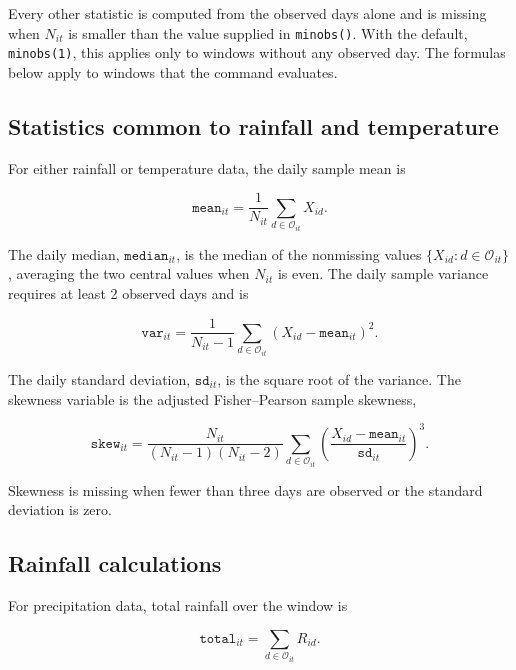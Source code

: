 \noindent Every other statistic is computed from the observed days alone and is missing when $N_{it}$ is smaller than the value supplied in \texttt{minobs()}. With the default, \texttt{minobs(1)}, this applies only to windows without any observed day. The formulas below apply to windows that the command evaluates.

\subsection{Statistics common to rainfall and temperature}

For either rainfall or temperature data, the daily sample mean is

\begin{equation}
	\texttt{mean}_{it} = \frac{1}{N_{it}} \sum_{d \in \mathcal{O}_{it}} X_{id} .
\end{equation}

\noindent The daily median, $\texttt{median}_{it}$, is the median of the nonmissing values $\{X_{id} : d \in \mathcal{O}_{it}\}$, averaging the two central values when $N_{it}$ is even. The daily sample variance requires at least 2 observed days and is

\begin{equation}
	\texttt{var}_{it} = \frac{1}{N_{it} - 1} \sum_{d \in \mathcal{O}_{it}} \left(X_{id} - \texttt{mean}_{it}\right)^2 .
\end{equation}

The daily standard deviation, $\texttt{sd}_{it}$, is the square root of the variance. The skewness variable is the adjusted Fisher--Pearson sample skewness,

\begin{equation}
	\texttt{skew}_{it} = \frac{N_{it}}{(N_{it} - 1) (N_{it} - 2)} \sum_{d \in \mathcal{O}_{it}} \left(\frac{X_{id} - \texttt{mean}_{it}}{\texttt{sd}_{it}}\right)^3 .
\end{equation}

\noindent Skewness is missing when fewer than three days are observed or the standard deviation is zero.

\subsection{Rainfall calculations}

For precipitation data, total rainfall over the window is

\begin{equation}
	\texttt{total}_{it} = \sum_{d \in \mathcal{O}_{it}} R_{id} .
\end{equation}

